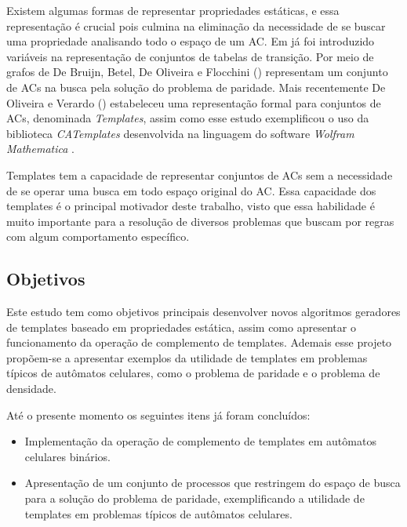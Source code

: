 \documentclass[12pt,a4paper]{article}
\begin{document}
Existem algumas formas de representar propriedades estáticas, e essa representação é crucial pois culmina na eliminação da necessidade de se buscar uma propriedade analisando todo o espaço de um AC. Em  já foi introduzido variáveis na representação de conjuntos de tabelas de transição. Por meio de grafos de De Bruijn, Betel, De Oliveira e Flocchini (\citeyear{Betel2013}) representam um conjunto de ACs na busca pela solução do problema de paridade. Mais recentemente De Oliveira e Verardo (\citeyear{deOliveira2014}) estabeleceu uma representação formal para conjuntos de ACs, denominada \textit{Templates}, assim como esse estudo exemplificou o uso da biblioteca \textit{CATemplates} \cite{CATemplates} desenvolvida na linguagem do software \textit{Wolfram Mathematica} \cite{woframMathematica10}.

Templates tem a capacidade de representar conjuntos de ACs sem a necessidade de se operar uma busca em todo espaço original do AC. Essa capacidade dos templates é o principal motivador deste trabalho, visto que essa habilidade é muito importante para a resolução de diversos problemas que buscam por regras com algum comportamento específico.

\subsection{Objetivos}
Este estudo tem como objetivos principais desenvolver novos algoritmos geradores de templates baseado em propriedades estática, assim como apresentar o funcionamento da operação de complemento de templates. Ademais esse projeto propõem-se a apresentar exemplos da utilidade de templates em problemas típicos de autômatos celulares, como o problema de paridade e o problema de densidade.

Até o presente momento os seguintes itens já foram concluídos:
      \begin{itemize}
          \item Implementação da operação de complemento de templates em autômatos celulares binários.
          \item Apresentação de um conjunto de processos que restringem do espaço de busca para a solução do problema de paridade, exemplificando a utilidade de templates em problemas típicos de autômatos celulares.
      \end{itemize}
\end{document}

